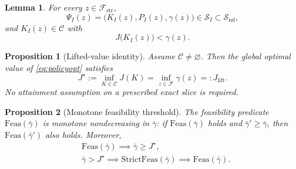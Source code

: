 \documentclass[10pt,a4paper]{amsart}
\newtheorem{lemma}{Lemma}
\newtheorem{proposition}{Proposition}
\providecommand{\cC}{\mathcal{C}}
\providecommand{\cF}{\mathcal{F}}
\providecommand{\cS}{\mathcal{S}}
\begin{document}
\begin{lemma}\label{lem:strict-lifted}
For every $z\in\cF_{\mathrm{str}}$,
\[
\Psi_I(z)=\bigl(K_I(z),P_I(z),\gamma(z)\bigr)\in \cS_I\subset \cS_{\mathrm{nd}},
\]
and $K_I(z)\in\cC$ with
\[
J\bigl(K_I(z)\bigr)<\gamma(z).
\]
\end{lemma}

\begin{proposition}[Lifted-value identity]\label{prop:global-value}
Assume $\cC\neq\varnothing$. Then the global optimal value of \eqref{eq:policyopt} satisfies
\begin{equation}
J^\star:=\inf_{K\in\cC}J(K)=\inf_{z\in\cF}\gamma(z)=:J_{\mathrm{lift}}.
\label{eq:global-value}
\end{equation}
No attainment assumption on a prescribed exact slice is required.
\end{proposition}

\begin{proposition}[Monotone feasibility threshold]\label{prop:feas-threshold}
The feasibility predicate $\mathrm{Feas}(\bar\gamma)$ is monotone nondecreasing in $\bar\gamma$: if $\mathrm{Feas}(\bar\gamma)$ holds and $\bar\gamma'\ge \bar\gamma$, then $\mathrm{Feas}(\bar\gamma')$ also holds. Moreover,
\begin{align*}
    & \mathrm{Feas}(\bar\gamma)\implies \bar\gamma\ge J^\star, \\
    &  \bar\gamma>J^\star\implies \mathrm{StrictFeas}(\bar\gamma)\implies \mathrm{Feas}(\bar\gamma).
\end{align*}

\end{proposition}
\end{document}
